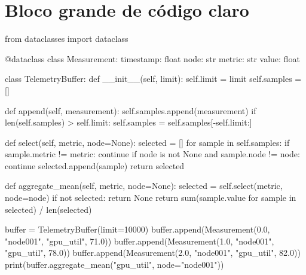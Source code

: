\clearpage
\section{Bloco grande de código claro}

\begin{VSCodeBlock}[title={Código grande}]
from dataclasses import dataclass

@dataclass
class Measurement:
    timestamp: float
    node: str
    metric: str
    value: float

class TelemetryBuffer:
    def __init__(self, limit):
        self.limit = limit
        self.samples = []

    def append(self, measurement):
        self.samples.append(measurement)
        if len(self.samples) > self.limit:
            self.samples = self.samples[-self.limit:]

    def select(self, metric, node=None):
        selected = []
        for sample in self.samples:
            if sample.metric != metric:
                continue
            if node is not None and sample.node != node:
                continue
            selected.append(sample)
        return selected

    def aggregate_mean(self, metric, node=None):
        selected = self.select(metric, node=node)
        if not selected:
            return None
        return sum(sample.value for sample in selected) / len(selected)

buffer = TelemetryBuffer(limit=10000)
buffer.append(Measurement(0.0, "node001", "gpu_util", 71.0))
buffer.append(Measurement(1.0, "node001", "gpu_util", 78.0))
buffer.append(Measurement(2.0, "node001", "gpu_util", 82.0))
print(buffer.aggregate_mean("gpu_util", node="node001"))
\end{VSCodeBlock}
